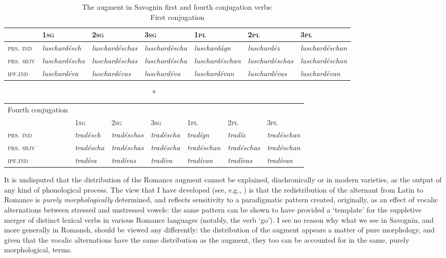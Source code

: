 \documentclass[output=paper,
modfonts
]{LSP/langsci}
\begin{document}
\begin{footnotesize}
\begin{longtable}[]{@{}lllllll@{}}
\caption{The augment in Savognin first and fourth conjugation verbs: \\ First conjugation}\\
\lsptoprule
& \textsc{1sg} & \textsc{2sg} & \textsc{3sg} & \textsc{1pl} &
\textsc{2pl} & \textsc{3pl}\tabularnewline
\midrule
\endhead
\textsc{prs. ind} & \emph{luschardésch} & \emph{luschardéschas} &
\emph{luschardéscha} & \emph{luschardágn} & \emph{luschardéz} &
\emph{luschardéschan}\tabularnewline
\textsc{prs. sbjv} & \emph{luschardéscha} & \emph{luschardéschas} &
\emph{luschardéscha} & \emph{luschardéschan} & \emph{luschardéschas} &
\emph{luschardéschan}\tabularnewline
\textsc{ipf.ind} & \emph{luschardéva} & \emph{luschardévas} &
\emph{luschardéva} & \emph{luschardévan} & \emph{luschardévas} &
\emph{luschardévan}\tabularnewline
\bottomrule
\end{longtable}\addtocounter{table}{-1}

\begin{longtable}[]{@{}lllllll@{}}
\caption*{Fourth conjugation}\\
\lsptoprule
& \textsc{1sg} & \textsc{2sg} & \textsc{3sg} & \textsc{1pl} &
\textsc{2pl} & \textsc{3pl}\tabularnewline
\midrule
\endhead
\textsc{prs. ind} & \emph{tradésch} & \emph{tradéschas} &
\emph{tradéscha} & \emph{tradígn} & \emph{tradíz} &
\emph{tradéschan}\tabularnewline
\textsc{prs. sbjv} & \emph{tradéscha} & \emph{tradéschas} &
\emph{tradéscha} & \emph{tradéschan} & \emph{tradéschas} &
\emph{tradéschan}\tabularnewline
\textsc{ipf.ind} & \emph{tradíva} & \emph{tradívas} & \emph{tradíva} &
\emph{tradívan} & \emph{tradívas} & \emph{tradívan}\tabularnewline
\bottomrule
\end{longtable}
\end{footnotesize}

It is undisputed that the distribution of the Romance augment cannot be
explained, diachronically or in modern varieties, as the output of any
kind of phonological process. The view that I have developed (see, e.g.,
\citealt{maiden2005a,maiden2011a,maiden2011c}) is that the redistribution of the alternant
from Latin to Romance is \emph{purely morphologically} determined, and
reflects sensitivity to a paradigmatic pattern created, originally, as
an effect of vocalic alternations between stressed and unstressed
vowels: the same pattern can be shown to have provided a `template' for
the suppletive merger of distinct lexical verbs in various Romance
languages (notably, the verb `go'). I see no reason why what we see in
Savognin, and more generally in Romansh, should be viewed any
differently: the distribution of the augment appears a matter of pure
morphology, and given that the vocalic alternations have the same
distribution as the augment, they too can be accounted for in the same,
purely morphological, terms.
\end{document}

